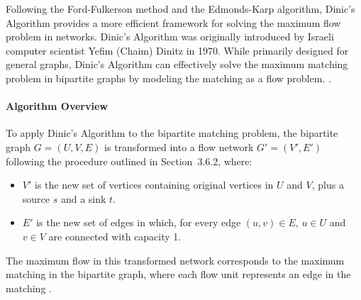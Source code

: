 
Following the Ford-Fulkerson method and the Edmonds-Karp algorithm, Dinic's Algorithm provides a more efficient framework for solving the maximum flow problem in networks. Dinic's Algorithm was originally introduced by Israeli computer scientist Yefim (Chaim) Dinitz in 1970. While primarily designed for general graphs, Dinic's Algorithm can effectively solve the maximum matching problem in bipartite graphs by modeling the matching as a flow problem. \cite{dinitz1970algorithm}.

\paragraph{Algorithm Overview}

To apply Dinic's Algorithm to the bipartite matching problem, the bipartite graph $G=(U,V,E)$ is transformed into a flow network $G'=(V',E')$ following the procedure outlined in Section~3.6.2, where:
\begin{itemize}
    \item $V'$ is the new set of vertices containing original vertices in $U$ and $V$, plus a source $s$ and a sink $t$.
    \item $E'$ is the new set of edges in which, for every edge $(u,v) \in E$, $u \in U$ and $v \in V$ are connected with capacity 1.
\end{itemize}

The maximum flow in this transformed network corresponds to the maximum matching in the bipartite graph, where each flow unit represents an edge in the matching \cite{cormen2009introduction}.


